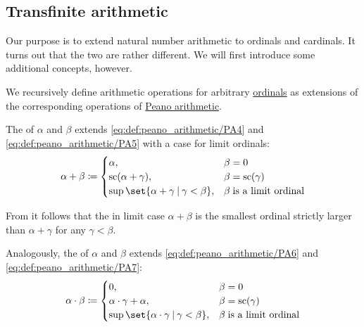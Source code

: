 \subsection{Transfinite arithmetic}\label{subsec:transfinite_arithmetic}

Our purpose is to extend natural number arithmetic to ordinals and cardinals. It turns out that the two are rather different. We will first introduce some additional concepts, however.

\begin{definition}\label{def:ordinal_arithmetic}
  We recursively define arithmetic operations for arbitrary \hyperref[def:ordinal]{ordinals} as extensions of the corresponding operations of \hyperref[def:peano_arithmetic]{Peano arithmetic}.

  \begin{thmenum}
     The  of \( \alpha \) and \( \beta \) extends \eqref{eq:def:peano_arithmetic/PA4} and \eqref{eq:def:peano_arithmetic/PA5} with a case for limit ordinals:
    \begin{equation}\label{eq:def:ordinal_arithmetic/addition}
      \alpha + \beta \coloneqq \begin{cases}
        \alpha,                                            &\beta = 0 \\
        \op{sc}(\alpha + \gamma),                        &\beta = \op{sc}(\gamma) \\
        \sup\set{ \alpha + \gamma \given \gamma < \beta }, &\beta \T{is a limit ordinal} \\
      \end{cases}
    \end{equation}

    From  it follows that the in limit case \( \alpha + \beta \) is the smallest ordinal strictly larger than \( \alpha + \gamma \) for any \( \gamma < \beta \).

     Analogously, the  of \( \alpha \) and \( \beta \) extends \eqref{eq:def:peano_arithmetic/PA6} and \eqref{eq:def:peano_arithmetic/PA7}:
    \begin{equation}\label{eq:def:ordinal_arithmetic/multiplication}
      \alpha \cdot \beta \coloneqq \begin{cases}
        0,                                                     &\beta = 0 \\
        \alpha \cdot \gamma + \alpha,                          &\beta = \op{sc}(\gamma) \\
        \sup\set{ \alpha \cdot \gamma \given \gamma < \beta }, &\beta \T{is a limit ordinal} \\
      \end{cases}
    \end{equation}


\end{thmenum}
\end{definition}
